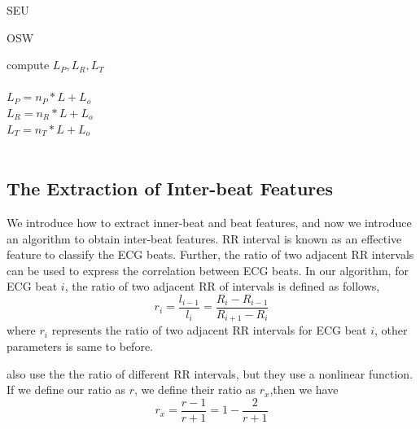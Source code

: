 \documentclass[wcp]{jmlr}
\begin{document}
\noindent
\begin{minipage}{.5\textwidth}
\centering
\begin{algorithm}[H]
\SetAlgoNoLine
\caption{SEU}
\label{Alg 1}
\end{algorithm}
\end{minipage}
\begin{minipage}{.5\textwidth}
\centering
\begin{algorithm}[H]
\SetAlgoNoLine
\caption{OSW}
\label{Alg 2}
compute $L_P, L_R, L_T$\\
\\
$L_P = n_P*L + L_o$\\
$L_R = n_R*L + L_o$\\
$L_T = n_T*L + L_o$\\
\\
\end{algorithm}
\end{minipage}

\subsection{The Extraction of Inter-beat Features}
We introduce how to extract inner-beat and beat features, and now we introduce an algorithm to obtain inter-beat features. RR interval is known as an effective feature to classify the ECG beats. Further, the ratio of two adjacent RR intervals can be used to express the correlation between ECG beats. In our algorithm, for ECG beat $i$, the ratio of two adjacent RR of intervals is defined as follows,
\begin{equation}\label{Eq. 5}
  r_i = \frac{l_{i-1}}{l_i} = \frac{R_i - R_{i-1}}{R_{i+1} - R_i}
\end{equation}
where $r_i$ represents the ratio of two adjacent RR intervals for ECG beat $i$, other parameters is same to before. 


\cite{xiang2018ecg} also use the the ratio of different RR intervals, but they use a nonlinear function. If we define our ratio as $r$, we define their ratio as $r_x$,then we have
\begin{equation}\label{Eq. 6}
  r_x = \frac{r - 1}{r + 1} = 1- \frac{2}{r+1}
\end{equation}
\end{document}

